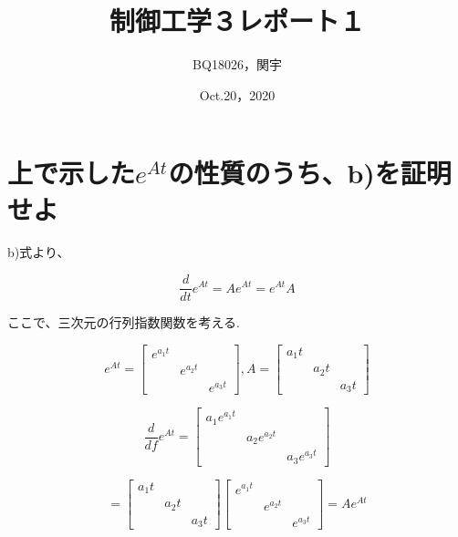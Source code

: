 \documentclass[xelatex,ja=standard,jafont=noto]{bxjsarticle}
\title{制御工学３レポート１	}
\author{BQ18026，関宇 }
\date{Oct.20，2020}
\begin{document}
		\maketitle
		
		
		
	\section{上で示した$ e^{At} $の性質のうち、b)を証明せよ}
	
	b)式より、
	
	\begin{equation}
	    \frac{d}{dt}e^{At}=Ae^{At}=e^{At}A
	\end{equation}
	
	ここで、三次元の行列指数関数を考える.
	
	\begin{equation}
	    e^{At}={
\left[ \begin{array}{ccc}
e^{a_{1}t}&&\\
&e^{a_{2}t}&\\
&&e^{a_{3}t}
\end{array}
\right ]},A={
\left[ \begin{array}{ccc}
a_{1}t&&\\
&a_{2}t&\\
&&a_{3}t
\end{array}
\right ]}
	\end{equation}
	
	
	\begin{equation}
	    \frac{d}{df}e^{At}={
\left[ \begin{array}{ccc}
a_{1}e^{a_{1}t}&&\\
&a_{2}e^{a_{2}t}&\\
&&a_{3}e^{a_{3}t}
\end{array}
\right ]}
	\end{equation}
	
	\begin{equation}
	    ={
\left[ \begin{array}{ccc}
a_{1}t&&\\
&a_{2}t&\\
&&a_{3}t
\end{array}
\right ]}{
\left[ \begin{array}{ccc}
e^{a_{1}t}&&\\
&e^{a_{2}t}&\\
&&e^{a_{3}t}
\end{array}
\right ]}=Ae^{At}
	\end{equation}
	
\end{document}
